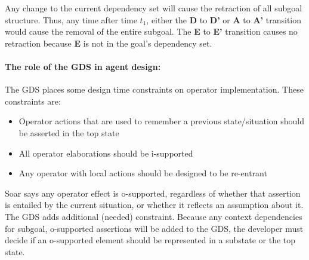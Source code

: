 Any change to the current dependency set will cause
the retraction of all subgoal structure. Thus, any time after time
$t_1$, either the {\bf D} to {\bf D'} or {\bf A} to {\bf A'}
transition would cause the removal of the entire subgoal. The {\bf E}
to {\bf E'} transition causes no retraction because {\bf E} is not in
the goal's dependency set.

\paragraph{The role of the GDS in agent design:}


The GDS places some design time constraints on operator implementation.
These constraints are:
\begin{itemize} \vspace{-10pt}
	\item Operator actions that are used to remember a previous state/situation should be asserted in the top state \vspace{-8pt}
	\item All operator elaborations should be i-supported \vspace{-8pt}
	\item Any operator with local actions should be designed to be re-entrant
\end{itemize}

Soar says any operator effect is o-supported, regardless of whether
that assertion is entailed by the current situation, or whether it
reflects an assumption about it. The GDS adds additional (needed)
constraint.  Because any context dependencies for subgoal, o-supported
assertions will be added to the GDS, the developer must decide if an
o-supported element should be represented in a substate or the top
state.


